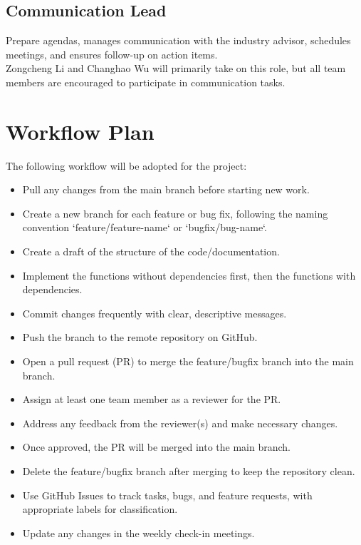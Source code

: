 \documentclass{article}
\begin{document}
\subsection*{Communication Lead}
Prepare agendas, manages communication with the industry advisor, schedules meetings, and ensures follow-up on action items. \\
Zongcheng Li and Changhao Wu will primarily take on this role, but all team members are encouraged to participate in communication tasks.

\section{Workflow Plan}

The following workflow will be adopted for the project:
\begin{itemize}
  \item Pull any changes from the main branch before starting new work.
	\item Create a new branch for each feature or bug fix, following the naming convention `feature/feature-name` or `bugfix/bug-name`.
	\item Create a draft of the structure of the code/documentation.
	\item Implement the functions without dependencies first, then the functions with dependencies.
	\item Commit changes frequently with clear, descriptive messages.
	\item Push the branch to the remote repository on GitHub.
	\item Open a pull request (PR) to merge the feature/bugfix branch into the main branch.
	\item Assign at least one team member as a reviewer for the PR.
	\item Address any feedback from the reviewer(s) and make necessary changes.
	\item Once approved, the PR will be merged into the main branch.
	\item Delete the feature/bugfix branch after merging to keep the repository clean.
	\item Use GitHub Issues to track tasks, bugs, and feature requests, with appropriate labels for classification.
	\item Update any changes in the weekly check-in meetings.
\end{itemize}
\end{document}
